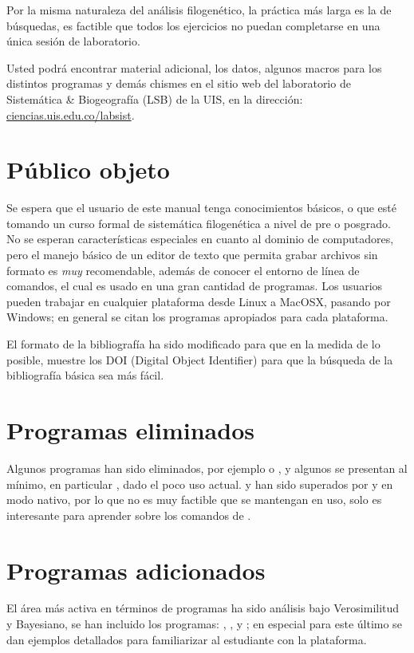 Por la misma naturaleza del an\'alisis filogen\'etico, la pr\'actica m\'as larga es la de b\'usquedas, es factible que todos los ejercicios no puedan completarse en una \'unica sesi\'on de laboratorio.

Usted podr\'a encontrar material adicional, los datos, algunos macros para los distintos programas y dem\'as chismes en el sitio web del laboratorio de Sistem\'atica \& Biogeograf\'ia (LSB) de la UIS, en la direcci\'on: 
\url{ciencias.uis.edu.co/labsist}.
\section*{P\'ublico objeto}
Se espera que el usuario de este manual tenga conocimientos b\'asicos, o que est\'e tomando un curso formal de sistem\'atica filogen\'etica a nivel de pre o posgrado. No se esperan caracter\'isticas especiales en cuanto al dominio de computadores, pero el manejo b\'asico de un editor de texto que permita grabar archivos sin formato es \emph{muy} recomendable, adem\'as de conocer el entorno de l\'inea de comandos, el cual es usado en una gran cantidad de programas. Los usuarios pueden trabajar en cualquier plataforma desde Linux a 
MacOSX, pasando por Windows; en general se citan los programas apropiados para cada plataforma.

El formato de la bibliograf\'ia ha sido modificado para que en la medida de lo posible, muestre los DOI (Digital Object Identifier) para que la	 b\'usqueda de la bibliograf\'ia b\'asica sea m\'as f\'acil.

\section*{Programas eliminados}
Algunos programas han sido eliminados, por ejemplo  o , y algunos se presentan al m\'inimo, en particular , dado el poco uso actual.  y  han sido superados por  y  en modo nativo, por lo que no es muy factible que se mantengan en uso, solo  es interesante para aprender sobre los comandos de .


\section*{Programas adicionados}

El \'area m\'as activa en t\'erminos de programas ha sido an\'alisis bajo Verosimilitud y Bayesiano, se han incluido los programas:  
, ,  y ; en especial para este \'ultimo se dan ejemplos detallados para familiarizar al estudiante con la plataforma. 



